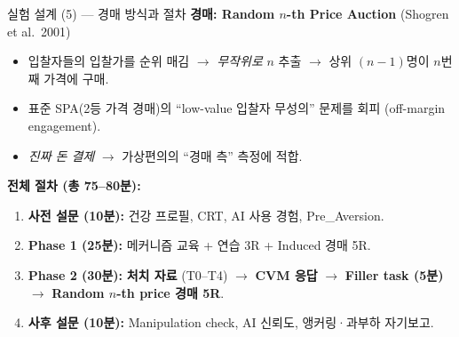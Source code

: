 \documentclass[aspectratio=169]{beamer}
\begin{document}
\begin{frame}{실험 설계 (5) --- 경매 방식과 절차}
  \textbf{경매: Random $n$-th Price Auction} (Shogren et al.\ 2001)
  \begin{itemize}\itemsep0.1em
    \item 입찰자들의 입찰가를 순위 매김 $\rightarrow$ \emph{무작위로} $n$ 추출 $\rightarrow$ 상위 $(n-1)$명이 $n$번째 가격에 구매.
    \item 표준 SPA(2등 가격 경매)의 ``low-value 입찰자 무성의'' 문제를 회피 (off-margin engagement).
    \item \emph{진짜 돈 결제} $\rightarrow$ 가상편의의 ``경매 측'' 측정에 적합.
  \end{itemize}

  \vspace{0.4em}
  \textbf{전체 절차 (총 75--80분):}
  \begin{enumerate}\itemsep0.1em
    \item \textbf{사전 설문 (10분):} 건강 프로필, CRT, AI 사용 경험, Pre\_Aversion.
    \item \textbf{Phase 1 (25분):} 메커니즘 교육 + 연습 3R + Induced 경매 5R.
    \item \textbf{Phase 2 (30분):} \textbf{처치 자료} (T0--T4) $\rightarrow$ \textbf{CVM 응답} $\rightarrow$ \textbf{Filler task (5분)} $\rightarrow$ \textbf{Random $n$-th price 경매 5R}.
    \item \textbf{사후 설문 (10분):} Manipulation check, AI 신뢰도, 앵커링·과부하 자기보고.
  \end{enumerate}

  \vspace{0.3em}
\end{frame}

\end{document}
